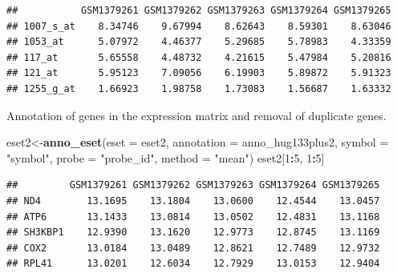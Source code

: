 \documentclass[
  12pt,
]{book}
\newenvironment{Shaded}{\begin{snugshade}}{\end{snugshade}}
\newcommand{\AttributeTok}[1]{\textcolor[rgb]{0.13,0.29,0.53}{#1}}
\newcommand{\DecValTok}[1]{\textcolor[rgb]{0.00,0.00,0.81}{#1}}
\newcommand{\FunctionTok}[1]{\textcolor[rgb]{0.13,0.29,0.53}{\textbf{#1}}}
\newcommand{\NormalTok}[1]{#1}
\newcommand{\OtherTok}[1]{\textcolor[rgb]{0.56,0.35,0.01}{#1}}
\newcommand{\SpecialCharTok}[1]{\textcolor[rgb]{0.81,0.36,0.00}{\textbf{#1}}}
\newcommand{\StringTok}[1]{\textcolor[rgb]{0.31,0.60,0.02}{#1}}
\begin{document}
\begin{verbatim}
##           GSM1379261 GSM1379262 GSM1379263 GSM1379264 GSM1379265
## 1007_s_at    8.34746    9.67994    8.62643    8.59301    8.63046
## 1053_at      5.07972    4.46377    5.29685    5.78983    4.33359
## 117_at       5.65558    4.48732    4.21615    5.47984    5.20816
## 121_at       5.95123    7.09056    6.19903    5.89872    5.91323
## 1255_g_at    1.66923    1.98758    1.73083    1.56687    1.63332
\end{verbatim}

Annotation of genes in the expression matrix and removal of duplicate genes.

\begin{Shaded}
\begin{Highlighting}[]
\NormalTok{eset2}\OtherTok{\textless{}{-}}\FunctionTok{anno\_eset}\NormalTok{(}\AttributeTok{eset       =}\NormalTok{ eset2,}
                 \AttributeTok{annotation =}\NormalTok{ anno\_hug133plus2,}
                 \AttributeTok{symbol     =} \StringTok{"symbol"}\NormalTok{,}
                 \AttributeTok{probe      =} \StringTok{"probe\_id"}\NormalTok{,}
                 \AttributeTok{method     =} \StringTok{"mean"}\NormalTok{)}
\NormalTok{eset2[}\DecValTok{1}\SpecialCharTok{:}\DecValTok{5}\NormalTok{, }\DecValTok{1}\SpecialCharTok{:}\DecValTok{5}\NormalTok{]}
\end{Highlighting}
\end{Shaded}

\begin{verbatim}
##         GSM1379261 GSM1379262 GSM1379263 GSM1379264 GSM1379265
## ND4        13.1695    13.1804    13.0600    12.4544    13.0457
## ATP6       13.1433    13.0814    13.0502    12.4831    13.1168
## SH3KBP1    12.9390    13.1620    12.9773    12.8745    13.1169
## COX2       13.0184    13.0489    12.8621    12.7489    12.9732
## RPL41      13.0201    12.6034    12.7929    13.0153    12.9404
\end{verbatim}
\end{document}
